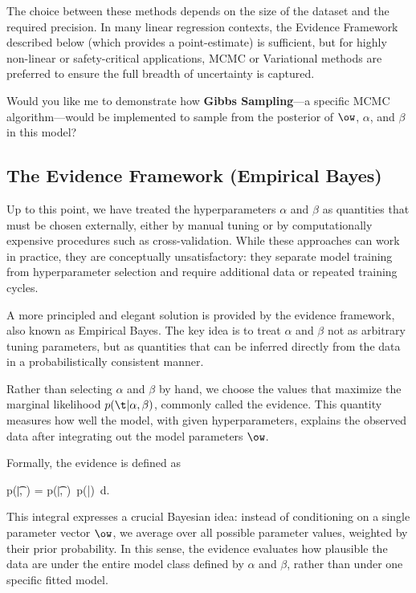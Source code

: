 \begin{description}
The choice between these methods depends on the size of the dataset and the required precision. In many linear regression contexts, the \alert{Evidence Framework} described below (which provides a point-estimate) is sufficient, but for highly non-linear or safety-critical applications, MCMC or Variational methods are preferred to ensure the full breadth of uncertainty is captured.

\medskip
\noindent Would you like me to demonstrate how \textbf{Gibbs Sampling}—a specific MCMC algorithm—would be implemented to sample from the posterior of $\ow$, $\alpha$, and $\beta$ in this model?
\end{description}

\subsection*{The Evidence Framework (Empirical Bayes)}

Up to this point, we have treated the hyperparameters $\alpha$ and $\beta$ as quantities that must be chosen externally, either by manual tuning or by computationally expensive procedures such as cross-validation. While these approaches can work in practice, they are conceptually unsatisfactory: they separate model training from hyperparameter selection and require additional data or repeated training cycles.

A more principled and elegant solution is provided by the \alert{evidence framework}, also known as \alert{Empirical Bayes}. The key idea is to treat $\alpha$ and $\beta$ not as arbitrary tuning parameters, but as quantities that can be inferred directly from the data in a probabilistically consistent manner.

Rather than selecting $\alpha$ and $\beta$ by hand, we choose the values that maximize the \alert{marginal likelihood} $p(\t|\alpha, \beta)$, commonly called the \alert{evidence}. This quantity measures how well the model, with given hyperparameters, explains the observed data after integrating out the model parameters $\ow$.

Formally, the evidence is defined as
\begin{myequation}
p(\t|\alpha, \beta) = \int p(\t|\ow, \beta)\, p(\ow|\alpha)\, d\ow .
\end{myequation}

This integral expresses a crucial Bayesian idea: instead of conditioning on a single parameter vector $\ow$, we average over all possible parameter values, weighted by their prior probability. In this sense, the evidence evaluates how plausible the data are under the entire model class defined by $\alpha$ and $\beta$, rather than under one specific fitted model.

